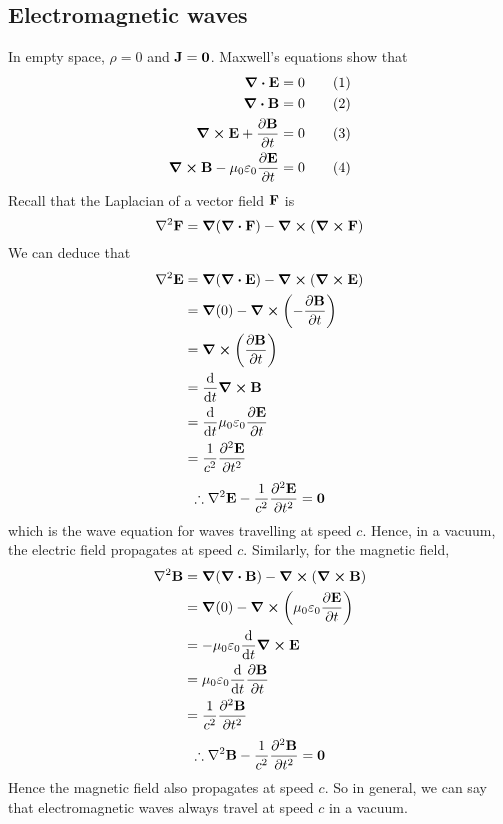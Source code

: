 \subsection{Electromagnetic waves}
In empty space, \(\rho = 0\) and \(\vb J = \vb 0\).
Maxwell's equations show that
\begin{align}
	\div{\vb E}                                       & = 0 \tag{1} \\
	\div{\vb B}                                       & = 0 \tag{2} \\
	\curl{\vb E} + \pdv{\vb B}{t}                     & = 0 \tag{3} \\
	\curl{\vb B} - \mu_0 \varepsilon_0 \pdv{\vb E}{t} & = 0 \tag{4}
\end{align}
Recall that the Laplacian of a vector field \(\vb F\) is
\[
	\laplacian \vb F = \grad(\div{\vb F}) - \curl(\curl{\vb F})
\]
We can deduce that
\begin{align*}
	\laplacian \vb E & = \grad(\div{\vb E}) - \curl(\curl{\vb E})  \\
	                 & = \grad(0) - \curl(-\pdv{\vb B}{t})         \\
	                 & = \curl(\pdv{\vb B}{t})                     \\
	                 & = \dv{t} \curl{\vb B}                       \\
	                 & = \dv{t} \mu_0 \varepsilon_0 \pdv{\vb E}{t} \\
	                 & = \frac{1}{c^2} \pdv[2]{\vb E}{t}
\end{align*}
\[
	\therefore \laplacian \vb E - \frac{1}{c^2} \pdv[2]{\vb E}{t} = \vb 0
\]
which is the wave equation for waves travelling at speed \(c\).
Hence, in a vacuum, the electric field propagates at speed \(c\).
Similarly, for the magnetic field,
\begin{align*}
	\laplacian \vb B & = \grad(\div{\vb B}) - \curl(\curl{\vb B})             \\
	                 & = \grad(0) - \curl(\mu_0 \varepsilon_0 \pdv{\vb E}{t}) \\
	                 & = -\mu_0\varepsilon_0 \dv{t} \curl{\vb E}              \\
	                 & = \mu_0\varepsilon_0 \dv{t} \pdv{\vb B}{t}             \\
	                 & = \frac{1}{c^2} \pdv[2]{\vb B}{t}
\end{align*}
\[
	\therefore \laplacian \vb B - \frac{1}{c^2} \pdv[2]{\vb B}{t} = \vb 0
\]
Hence the magnetic field also propagates at speed \(c\).
So in general, we can say that electromagnetic waves always travel at speed \(c\) in a vacuum.

